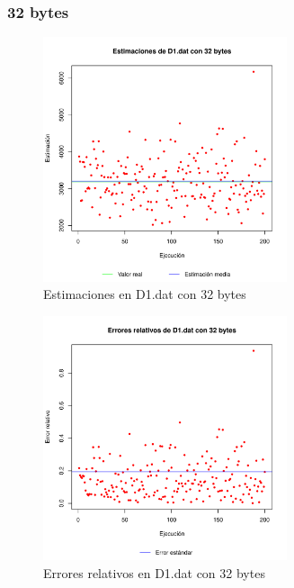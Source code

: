 \subsubsection{32 bytes}
\begin{figure}[h!]
    \centering
        \includegraphics[width=0.64\textwidth]{../figs/D1/plot_estimation_32.pdf}
        \caption{Estimaciones en D1.dat con 32 bytes}
    \label{figura:D1_estimation_32}
\end{figure}

\begin{figure}[h!]
    \centering
        \includegraphics[width=0.64\textwidth]{../figs/D1/plot_errors_32.pdf}
        \caption{Errores relativos en D1.dat con 32 bytes}
    \label{figura:D1_errors_32}
\end{figure}

